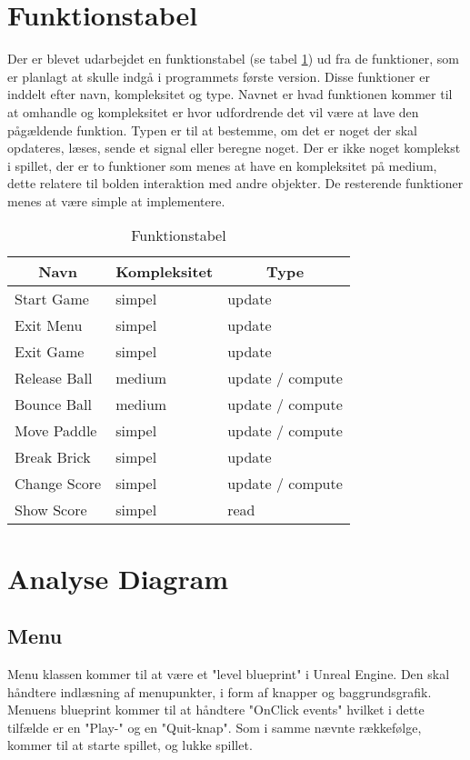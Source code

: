 \section{Funktionstabel}
Der er blevet udarbejdet en funktionstabel (se  tabel \ref{funktionstabel}) ud fra de funktioner, som er  planlagt at skulle indgå i programmets første version. Disse funktioner er inddelt efter navn, kompleksitet og type. Navnet er hvad funktionen kommer til at omhandle og kompleksitet er hvor udfordrende det vil være at lave den pågældende funktion. Typen er til at bestemme, om det er noget der skal opdateres, læses, sende et signal eller beregne noget. Der er ikke noget komplekst i spillet, der er to funktioner som menes at have en kompleksitet på medium, dette relatere til bolden interaktion med andre objekter. De resterende funktioner menes at være simple at implementere.
\begin{table}[]
\centering
\caption{Funktionstabel}
\label{funktionstabel}
\begin{tabular}{|l|l|l|}
\hline
\multicolumn{1}{|c|}{Navn} & \multicolumn{1}{c|}{Kompleksitet} & \multicolumn{1}{c|}{Type} \\ \hline
Start Game & simpel & update \\ \hline
Exit Menu & simpel & update \\ \hline
Exit Game & simpel & update \\ \hline
Release Ball & medium & update / compute \\ \hline
Bounce Ball & medium & update / compute \\ \hline
Move Paddle & simpel & update / compute \\ \hline
Break Brick & simpel & update \\ \hline
Change Score & simpel & update / compute \\ \hline
Show Score & simpel & read \\ \hline
\end{tabular}
\end{table}

\section{Analyse Diagram}

\subsection{Menu}
Menu klassen kommer til at være et "level blueprint" i Unreal Engine. Den skal håndtere indlæsning af menupunkter, i form af knapper og baggrundsgrafik. Menuens blueprint kommer til at håndtere "OnClick events" hvilket i dette tilfælde er en "Play-" og en "Quit-knap". Som i samme nævnte rækkefølge, kommer til at starte spillet, og lukke spillet.

